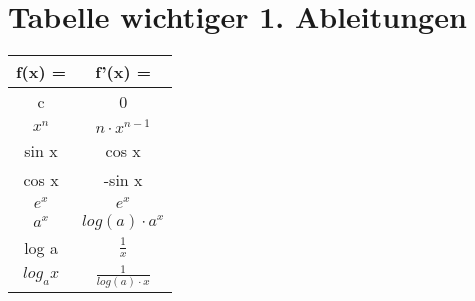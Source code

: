 \documentclass[../mainfile.tex]{article}
\begin{document}
				
	\section{Tabelle wichtiger 1. Ableitungen}
		{\centering
		{\large
		\renewcommand{\arraystretch}{1.3}
		\begin{tabular}{c|c}
			f(x) =		&	f'(x) =                     \\ \hline
			c           &	0                           \\ \hline
			$x^n$ 	    &	$n \cdot x^{n-1}$ 			\\ \hline
			sin x       &	cos x                       \\ \hline
			cos x       &	-sin x                      \\ \hline
			$e^x$		&	$e^x$         				\\ \hline
			$a^x$ 		&	$log(a) \cdot a^x$  		\\ \hline
			log a       &	$\frac{1}{x}$               \\ \hline
			$log_a x$   &	$\frac{1}{log(a) \cdot x}$                 
		\end{tabular}\par
		}		
		}
		\renewcommand{\arraystretch}{1.3}
		
\end{document}
